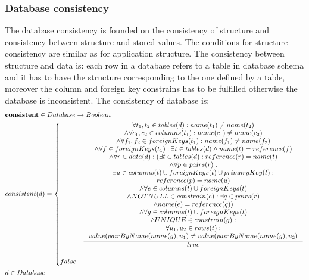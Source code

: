\documentclass[11pt]{article}
\begin{document}
\subsubsection{Database consistency}
The database consistency is founded on the consistency of structure and consistency between structure and stored values. The conditions for structure consistency are similar as for application structure. The consistency between structure and data is:  each row in a database  refers to a table in database schema and it has to have the structure corresponding to the one defined by a table, moreover the column and foreign key constrains has to be fulfilled  otherwise the database is inconsistent. The consistency of database is:
\begin{align*}
&	\mathbf{consistent} \in Database \rightarrow Boolean \\
&	consistent(d) = \begin{cases}
&		\inference{ \forall t_1, t_2 \in tables(d) : name(t_1) \neq name(t_2) \\ \wedge \forall c_1, c_2 \in columns(t_1) : name(c_1) \neq name(c_2) \\ \wedge \forall f_1, f_2 \in foreignKeys(t_1) : name(f_1) \neq name (f_2) \\ \wedge \forall f \in foreignKeys(t_1) : \exists t \in tables(d) \wedge name(t) = reference(f) \\ \wedge \forall r \in data(d): ( \exists t \in tables(d) : reference(r) = name(t) \\ \wedge \forall p \in pairs(r) :\\ \exists u \in columns(t) \cup foreignKeys(t) \cup primaryKey(t) : \\ reference(p) = name(u) \\ \wedge \forall e \in columns(t) \cup foreignKeys(t) \\ \wedge NOTNULL \in constrain(e) : \exists q \in pairs(r) \\ \wedge name(e) = reference(q)) \\ \wedge \forall g \in columns(t) \cup foreignKeys(t) \\ \wedge UNIQUE \in constrain(g) : \\ \forall u_1, u_2 \in rows(t) : \\ value(pairByName(name(g), u_1) \neq value(pairByName(name(g), u_2) }{true}
 	\\ \\
 	false
 \end{cases}\\
& d \in Database
\end{align*}
 
\end{document}
